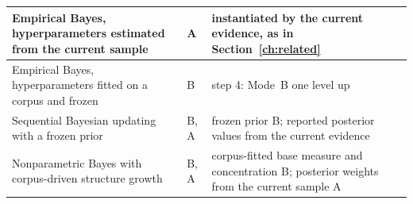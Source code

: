 \begin{table}[t]
\begin{tabular}{@{}>{\raggedright\arraybackslash}p{}>{\centering\arraybackslash}p{}>{\raggedright\arraybackslash}p{}@{}}
\hline
Empirical Bayes, hyperparameters estimated from the current sample & A & instantiated by the current evidence, as in Section~\ref{ch:related}\\
\hline
Empirical Bayes, hyperparameters fitted on a corpus and frozen & B & step 4: Mode~B one level up\\
\hline
Sequential Bayesian updating with a frozen prior & B, A & frozen prior B; reported posterior values from the current evidence\\
\hline
Nonparametric Bayes with corpus-driven structure growth & B, A & corpus-fitted base measure and concentration B; posterior weights from the current sample A\\
\hline
\end{tabular}
\end{table}
